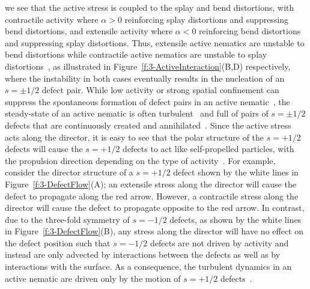 we see that the active stress is coupled to the splay and bend distortions, with contractile activity where $\alpha > 0$ reinforcing splay distortions and suppressing bend distortions, and extensile activity where $\alpha < 0$ reinforcing bend distortions and suppressing splay distortions.
Thus, extensile active nematics are unstable to bend distortions while contractile active nematics are unstable to splay distortions~\cite{RN171,RN170,RN11}, as illustrated in Figure~\ref{f:3-ActiveInteraction}(B,D) respectively, where the instability in both cases eventually results in the nucleation of an $s=\pm 1/2$ defect pair.
While low activity or strong spatial confinement can suppress the spontaneous formation of defect pairs in an active nematic~\cite{RN9,RN247,RN7}, the steady-state of an active nematic is often turbulent~\cite{RN7} and full of pairs of $s = \pm 1/2$ defects that are continuously created and annihilated~\cite{RN11,RN8,RN3,RN27,RN135,RN86}.
Since the active stress acts along the director, it is easy to see that the polar structure of the $s = +1/2$ defects will cause the $s = +1/2$ defects to act like self-propelled particles, with the propulsion direction depending on the type of activity~\cite{RN11,RN8}.
For example, consider the director structure of a $s = +1/2$ defect shown by the white lines in Figure~\ref{f:3-DefectFlow}(A); an extensile stress along the director will cause the defect to propagate along the red arrow.
However, a contractile stress along the director will cause the defect to propagate opposite to the red arrow.
In contrast, due to the three-fold symmetry of $s = -1/2$ defects, as shown by the white lines in Figure~\ref{f:3-DefectFlow}(B), any stress along the director will have no effect on the defect position such that $s = -1/2$ defects are not driven by activity and instead are only advected by interactions between the defects as well as by interactions with the surface.
As a consequence, the turbulent dynamics in an active nematic are driven only by the motion of $s = +1/2$ defects~\cite{RN7}.
